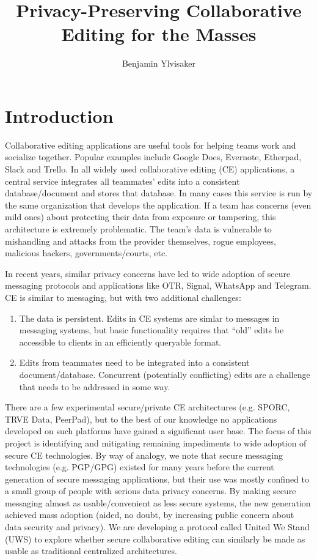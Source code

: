 \documentclass{article}
\begin{document}
\title{Privacy-Preserving Collaborative Editing for the Masses}
\author{Benjamin Ylvisaker}

\maketitle

\section{Introduction}

Collaborative editing applications are useful tools for helping teams work and socialize together.
Popular examples include Google Docs, Evernote, Etherpad, Slack and Trello.
In all widely used collaborative editing (CE) applications, a central service integrates all teammates' edits into a consistent database/document and stores that database.
In many cases this service is run by the same organization that develops the application.
If a team has concerns (even mild ones) about protecting their data from exposure or tampering, this architecture is extremely problematic.
The team's data is vulnerable to mishandling and attacks from the provider themselves, rogue employees, malicious hackers, governments/courts, etc.

In recent years, similar privacy concerns have led to wide adoption of secure messaging protocols and applications like OTR, Signal, WhatsApp and Telegram.
CE is similar to messaging, but with two additional challenges:
\begin{enumerate}
\item The data is persistent.
  Edits in CE systems are simlar to messages in messaging systems, but basic functionality requires that ``old'' edits be accessible to clients in an efficiently queryable format.
\item Edits from teammates need to be integrated into a consistent document{\slash}database.
  Concurrent (potentially conflicting) edits are a challenge that needs to be addressed in some way.
\end{enumerate}

There are a few experimental secure/private CE architectures (e.g. SPORC, TRVE Data, PeerPad), but to the best of our knowledge no applications developed on such platforms have gained a significant user base.
The focus of this project is identifying and mitigating remaining impediments to wide adoption of secure CE technologies.
By way of analogy, we note that secure messaging technologies (e.g. PGP/GPG) existed for many years before the current generation of secure messaging applications, but their use was mostly confined to a small group of people with serious data privacy concerns.
By making secure messaging almost as usable/convenient as less secure systems, the new generation achieved mass adoption (aided, no doubt, by increasing public concern about data security and privacy).
We are developing a protocol called United We Stand (UWS) to explore whether secure collaborative editing can similarly be made as usable as traditional centralized architectures.
\end{document}
